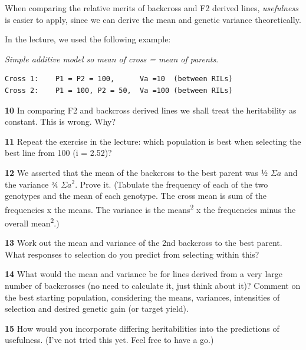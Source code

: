 \documentclass[
]{book}
\makeatletter
\newenvironment{kframe}{%
\medskip{}
\setlength{\fboxsep}{.8em}
 \def\at@end@of@kframe{}%
 \ifinner\ifhmode%
  \def\at@end@of@kframe{\end{minipage}}%
  \begin{minipage}{\columnwidth}%
 \fi\fi%
 \def\FrameCommand##1{\hskip\@totalleftmargin \hskip-\fboxsep
 \colorbox{shadecolor}{##1}\hskip-\fboxsep
     \hskip-\linewidth \hskip-\@totalleftmargin \hskip\columnwidth}%
 \MakeFramed {\advance\hsize-\width
   \@totalleftmargin\z@ \linewidth\hsize
   \@setminipage}}%
 {\par\unskip\endMakeFramed%
 \at@end@of@kframe}
\newenvironment{rmdblock}[1]
  {
  \begin{itemize}
  \renewcommand{\labelitemi}{
    \raisebox{-.7\height}[0pt][0pt]{
      {\setkeys{Gin}{width=3em,keepaspectratio}\texttt{[image: images/\#1]}}
    }
  }
  \setlength{\fboxsep}{1em}
  \begin{kframe}
  \item
  }
  {
  \end{kframe}
  \end{itemize}
  }
\newenvironment{rmdquiz}
  {\begin{rmdblock}{quiz}}
  {\end{rmdblock}}
\makeatother
\begin{document}
When comparing the relative merits of backcross and F2 derived lines, \emph{usefulness} is easier to apply, since we can derive the mean and genetic variance theoretically.

In the lecture, we used the following example:

\emph{Simple additive model so mean of cross = mean of parents}.

\begin{verbatim}
Cross 1:    P1 = P2 = 100,      Va =10  (between RILs)
Cross 2:    P1 = 100, P2 = 50,  Va =100 (between RILs)
\end{verbatim}

\begin{rmdquiz}
\textbf{10}
In comparing F2 and backcross derived lines we shall treat the heritability as constant. This is wrong. Why?
\end{rmdquiz}

\begin{rmdquiz}
\textbf{11}
Repeat the exercise in the lecture: which population is best when selecting the best line from 100 (i = 2.52)?
\end{rmdquiz}

\begin{rmdquiz}
\textbf{12}
We asserted that the mean of the backcross to the best parent was ½ \(Σa\) and the variance
¾ \(Σa^2\). Prove it. (Tabulate the frequency of each of the two genotypes and the mean of each genotype. The cross mean is sum of the frequencies x the means. The variance is the means\textsuperscript{2} x the frequencies minus the overall mean\textsuperscript{2}.)
\end{rmdquiz}

\begin{rmdquiz}
\textbf{13}
Work out the mean and variance of the 2nd backcross to the best parent. What responses to selection do you predict from selecting within this?
\end{rmdquiz}

\begin{rmdquiz}
\textbf{14}
What would the mean and variance be for lines derived from a very large number of backcrosses (no need to calculate it, just think about it)? Comment on the best starting population, considering the means, variances, intensities of selection and desired genetic gain (or target yield).
\end{rmdquiz}

\begin{rmdquiz}
\textbf{15}
How would you incorporate differing heritabilities into the predictions of usefulness. (I've not tried this yet. Feel free to have a go.)
\end{rmdquiz}
\end{document}

